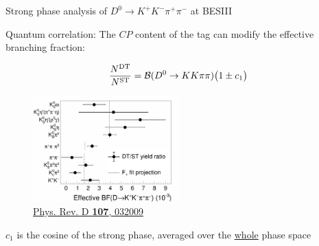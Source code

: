 \documentclass{beamer}
\begin{document}
\begin{frame}{Strong phase analysis of $D^0\to K^+K^-\pi^+\pi^-$ at BESIII}
  \begin{center}
    Quantum correlation: The $C\!P$ content of the tag can modify the effective branching fraction:
  \end{center}
  \begin{equation*}
    \frac{N^{\rm DT}}{N^{\rm ST}} = \mathcal{B}(D^0\to KK\pi\pi)\big(1\pm c_1\big)
  \end{equation*}
  \begin{figure}
    \includegraphics[width = 0.50\textwidth]{Plots/CPeven_fraction_combination_CPtags.png}
    \caption*{\tiny \href{https://journals.aps.org/prd/abstract/10.1103/PhysRevD.107.032009}{Phys. Rev. D \textbf{107}, 032009}}
  \end{figure}
  \vspace{-0.5cm}
  \begin{center}
    $c_1$ is the cosine of the strong phase, averaged over the \underline{whole} phase space
  \end{center}
\end{frame}
\end{document}
